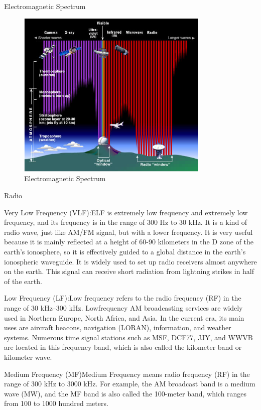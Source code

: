 \documentclass[conference]{IEEEtran}
\newcommand{\subparagraph}{}
\begin{document}
\subparagraph{Electromagnetic Spectrum} 

\begin{figure}[htbp]
    \centerline{\includegraphics[width=260pt]{images/1.2.png}}
    \caption{Electromagnetic Spectrum}
    \label{Spectrum}
\end{figure}

	\subparagraph{Radio}
	
	Very Low Frequency (VLF):ELF is extremely low frequency and extremely low frequency, and its frequency is in the range of 
	300 Hz to 30 kHz. It is a kind of radio wave, just like AM/FM signal, but with a lower frequency. It is very useful because 
	it is mainly reflected at a height of 60-90 kilometers in the D zone of the earth's ionosphere, so it is effectively guided 
	to a global distance in the earth's ionospheric waveguide. It is widely used to set up radio receivers almost anywhere on 
	the earth\cite{Introduc19:online}. This signal can receive short radiation from lightning strikes in half of the earth.
	
	Low Frequency (LF):Low frequency refers to the radio frequency (RF) in the range of 30 kHz–300 kHz. Low\-frequency AM 
	broadcasting services are widely used in Northern Europe, North Africa, and Asia. In the current era, its main uses are 
	aircraft beacons, navigation (LORAN), information, and weather systems. Numerous time signal stations such as MSF, DCF77, 
	JJY, and WWVB are located in this frequency band, which is also called the kilometer band or kilometer wave\cite{httpswww63:online}.
	
	Medium Frequency (MF)\:Medium Frequency means radio frequency (RF) in the range of 300 kHz to 3000 kHz. For example, 
	the AM broadcast band is a medium wave (MW), and the MF band is also called the 100-meter band, which ranges from 100 
	to 1000 hundred meters\cite{httpswww49:online}.
	
\end{document}
